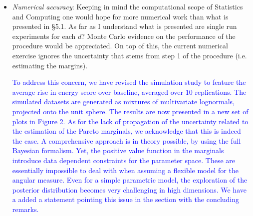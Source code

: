 \documentclass[10pt]{article}
\newcommand{\comment}[1]{\textcolor{teal}{#1}}
\newcommand{\bruno}[1]{\textcolor{red}{#1}}
\newcommand{\response}[1]{\textcolor{blue}{#1}}
\begin{document}
\begin{itemize}

    

\item \emph{Numerical accuracy}:  Keeping in mind the computational scope of 
    Statistics and Computing one would hope for more numerical work than what is 
    presented in §5.1. As far as I understand what is presented are single run 
    experiments for each $d$? Monte Carlo evidence on the performance of the 
    procedure would be appreciated. On top of this, the current numerical exercise
    ignores the uncertainty that stems from step 1 of the procedure 
    (i.e. estimating the margins).

\response{To address this concern, we have revised the simulation study to feature the 
    average rise in energy score over baseline, averaged over 10 replications.  
    The simulated datasets are generated as mixtures of multivariate lognormals, 
    projected onto the unit sphere.  The results are now presented in a new set
    of plots in Figure 2. As for the lack of propagation of the uncertainty
    related to the estimation of the Pareto marginals, we acknowledge that this is
    indeed the case. A comprehensive approach is in theory possible, by using the
    full Bayesian formalism. Yet, the positive value function in the marginals 
    introduce data dependent constraints for the parameter space. These are essentially
    impossible to deal with when assuming a flexible model for the angular
    measure. Even for a simple parametric model, the exploration of the posterior
    distribution becomes very challenging in high dimensions. We have a added
    a statement pointing this issue in the section with the concluding remarks.
    }


\end{itemize}
\end{document}
